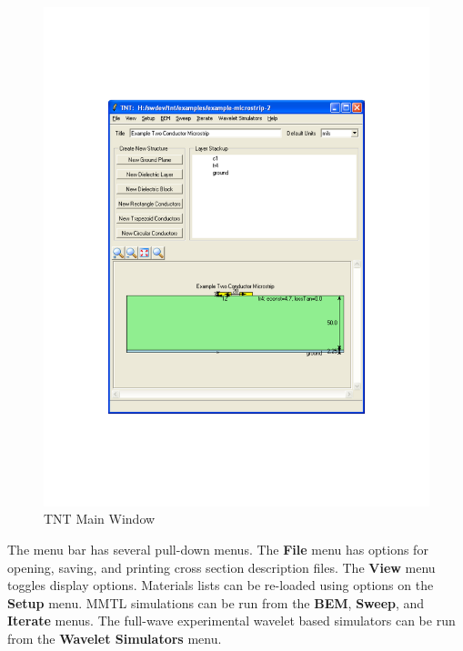 \documentclass{article}
\begin{document}
\begin{figure}[hbt]
\begin{center}\includegraphics[scale=0.5]{mainwindow}\end{center}
\caption { TNT Main Window }
\label{fig:mainwindow}
\end{figure}


The menu bar has several pull-down menus.  The {\bf File} menu has
options for opening, saving, and printing cross section description
files.  The {\bf View} menu toggles display options.  Materials lists
can be re-loaded using options on the {\bf Setup} menu.  MMTL
simulations can be run from the {\bf BEM}, {\bf Sweep}, and {\bf
Iterate} menus.  The full-wave experimental wavelet based simulators
can be run from the {\bf Wavelet Simulators} menu.



\end{document}
